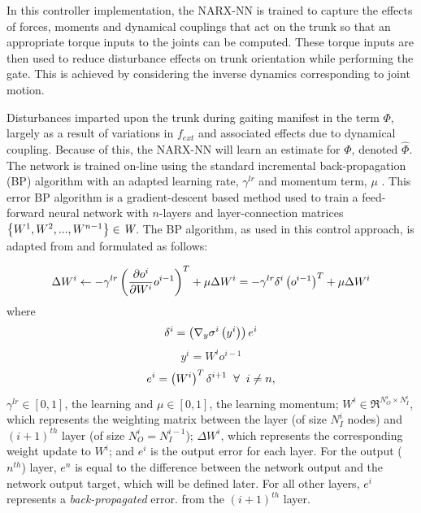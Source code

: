 		In this controller implementation, the NARX-NN is trained to capture the effects of forces, moments and dynamical couplings that act on the trunk so that an appropriate torque inputs to the joints can be computed. These torque inputs are then used to reduce disturbance effects on trunk orientation while performing the gate. This is achieved by considering the inverse dynamics corresponding to joint motion.

		Disturbances imparted upon the trunk during gaiting manifest in the term $\Phi$, largely as a result of variations in $f_{ext}$ and associated effects due to dynamical coupling. Because of this, the NARX-NN will learn an estimate for $\Phi$, denoted $\hat{\Phi}$. The network is trained on-line using the standard incremental back-propagation (BP) algorithm with an adapted learning rate, $\gamma^{lr}$ and momentum term, $\mu$ \cite{Rumelhart1988,Rumelhart1995}. This error BP algorithm is a gradient-descent based method used to train a feed-forward neural network with $n$-layers and layer-connection matrices $\left\{W^{1},W^{2},...,W^{n-1}\right\} \in \emph{W}$. The BP algorithm, as used in this control approach, is adapted from \cite{Rojas1996ch7} and formulated as follows: 

			\begin{equation}
				\Delta W^{i} \leftarrow
					-\gamma^{lr} \left( \frac{ \partial o^{i} }{\partial {W^{i} } }  o^{i-1} \right)^{T}  + \mu \Delta W^{i} = 
					-\gamma^{lr} \delta^{i} \left(o^{i-1}\right)^{T}  + \mu \Delta W^{i}
				\label{eq::bp_weight_update}
			\end{equation} 
		where
			\begin{equation*}
				\delta^{i} = \left( \nabla_{y} \sigma^{i}\left(y^{i}\right) \right) e^{i}
				\label{eq::bp_error}
			\end{equation*}
			\begin{equation*}
				y^{i} = W^{i} o^{i-1}
				\label{eq::bp_error}
			\end{equation*}
			\begin{equation*}
				e^{i} =  \left( W^{i} \right)^{T} \delta^{i+1} \hspace{2mm} \forall \hspace{2mm} i\neq n,
			\end{equation*}
		$\gamma^{lr} \in [0,1]$, the learning and  $\mu \in [0,1]$, the learning momentum; $W^{i} \in \Re^{N_{O}^{i}\times N_{I}^{i}}$, which represents the weighting matrix between the \Ith layer (of size $N_{I}^{i}$ nodes) and $(i+1)^{th}$ layer (of size $N_{O}^{i}=N_{I}^{i-1}$); $\Delta W^{i}$, which represents the corresponding weight update to $W^{i}$; and $e^{i}$ is the output error for each \Ith layer. For the output ($n^{th}$) layer, $e^{n}$ is equal to the difference between the network output and the network output target, which will be defined later. For all other layers, $e^{i}$ represents a \emph{back-propagated} error. from the $(i+1)^{th}$ layer.


